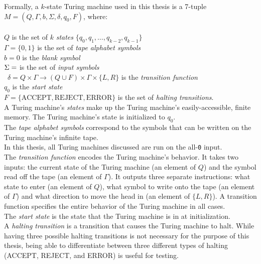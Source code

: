 \documentclass[11pt]{article}
\begin{document}
Formally, a $k$-state Turing machine used in this thesis is a 7-tuple $M = (Q, \Gamma, b, \Sigma, \delta, q_0, F)$, where: \\ \\
$Q$ is the set of $k$ \emph{states} $\{q_0, q_1, \dots, q_{k-2}, q_{k-1}\}$ \\
$\Gamma = \{0, 1\}$ is the set of \emph{tape alphabet symbols} \\
$b = 0$ is the \emph{blank symbol} \\
$\Sigma = \empty$ is the set of \emph{input symbols} \\\
$\delta = Q \times \Gamma \rightarrow (Q \cup F) \times \Gamma \times \{L, R\}$ is the \emph{transition function} \\
$q_0$ is the \emph{start state} \\
$F = \{\textrm{ACCEPT}, \textrm{REJECT}, \textrm{ERROR}\}$ is the set of \emph{halting transitions}. \\

A Turing machine's \emph{states} make up the Turing machine's easily-accessible, finite memory. The Turing machine's state is initialized to $q_0$. \\

The \emph{tape alphabet symbols} correspond to the symbols that can be written on the Turing machine's infinite tape. \\

In this thesis, all Turing machines discussed are run on the all-\texttt{0} input. \\

The \emph{transition function} encodes the Turing machine's behavior. It takes two inputs: the current state of the Turing machine (an element of $Q$) and the symbol read off the tape (an element of $\Gamma$). It outputs three separate instructions: what state to enter (an element of $Q$), what symbol to write onto the tape (an element of $\Gamma$) and what direction to move the head in (an element of $\{L, R\}$). A transition function specifies the entire behavior of the Turing machine in all cases. \\

The \emph{start state} is the state that the Turing machine is in at initialization. \\

A \emph{halting transition} is a transition that causes the Turing machine to halt. While having three possible halting transitions is not necessary for the purpose of this thesis, being able to differentiate between three different types of halting (ACCEPT, REJECT, and ERROR) is useful for testing.
\end{document}
